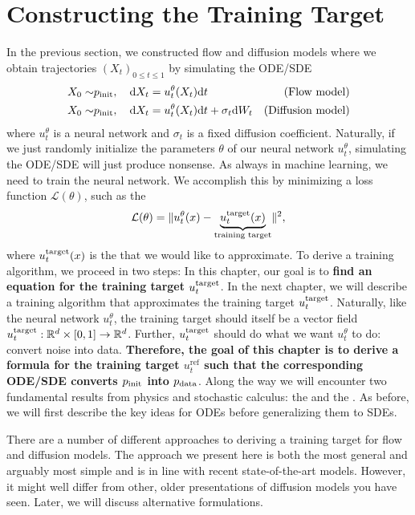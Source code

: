 \section{Constructing the Training Target}
\label{sec:fokker_planck}

In the previous section, we constructed flow and diffusion models where we obtain trajectories $(X_t)_{0\leq t\leq 1}$ by simulating the ODE/SDE
\begin{align}
\label{e:sde_generative_model_restated_section_3}
 X_0\sim&p_{\rm{init}},\quad \mathrm{d} X_t = u_t^\theta(X_t)\mathrm{d} t& \text{(Flow model)}\\
 X_0\sim&p_{\rm{init}},\quad \mathrm{d} X_t = u_t^\theta(X_t)\mathrm{d} t + \sigma_t\mathrm{d} W_t& \text{(Diffusion model)}
\end{align}
where $u_t^\theta$ is a neural network and $\sigma_t$ is a fixed diffusion coefficient. Naturally, if we just randomly initialize the parameters $\theta$ of our neural network $u_t^\theta$, simulating the ODE/SDE will just produce nonsense. As always in machine learning, we need to train the neural network. We accomplish this by minimizing a loss function $\mathcal{L}(\theta)$, such as the 
\begin{align*}
    \mathcal{L}(\theta) = \lVert u_t^\theta(x)-\underbrace{u^{\text{target}}_t(x)}_{\text{training target}}\rVert^2 ,
\end{align*}
where $u^{\text{target}}_t(x)$ is the  that we would like to approximate. To derive a training algorithm, we proceed in two steps: In this chapter, our goal is to \textbf{find an equation for the training target $u^{\text{target}}_t$}. In the next chapter, we will describe a training algorithm that approximates the training target $u^{\text{target}}_t$. Naturally, like the neural network $u_t^\theta$, the training target should itself be a vector field $u^{\text{target}}_t:\mathbb{R}^d\times[0,1]\to\mathbb{R}^d$. Further, $u^{\text{target}}_t$ should do what we want $u_t^\theta$ to do: convert noise into data. \textbf{Therefore, the goal of this chapter is to derive a formula for the training target $u_t^\text{ref}$ such that the corresponding ODE/SDE converts $p_{\rm{init}}$ into $p_{\rm{data}}$}. Along the way we will encounter two fundamental results from physics and stochastic calculus: the  and the . As before, we will first describe the key ideas for ODEs before generalizing them to SDEs.

\begin{remarkbox}
There are a number of different approaches to deriving a training target for flow and diffusion models. The approach we present here is both the most general and arguably most simple and is in line with recent state-of-the-art models. However, it might well differ from other, older presentations of diffusion models you have seen. Later, we will discuss  alternative formulations.
\end{remarkbox}

